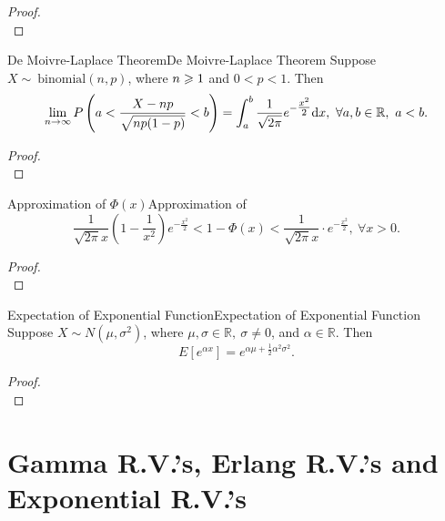\documentclass{elegantbook}
\begin{document}
\begin{proof}
\\[4cm]\vspace{0.01cm}
\end{proof}

\begin{theorem}{De Moivre-Laplace Theorem}{De Moivre-Laplace Theorem}
Suppose $X\sim\ \mathrm{binomial}(n,p)$, where $n\geqslant1$ and $0<p<1$. Then
\[\lim_{n \rightarrow \infty}{P\left( a < \frac{X - np}{\sqrt{np( 1 - p )}} < b \right) = \int_{a}^{b}\frac{1}{\sqrt{2\pi}}}e^{- \tfrac{x^{2}}{2}}\dif x,\ \forall a,b \in \mathbb{R},\ a < b.\]
\end{theorem}

\begin{proof}
\\[4cm]\vspace{0.01cm}
\end{proof}

\begin{theorem}{Approximation of $\Phi(x)$}{Approximation of }
\[\frac{1}{\sqrt{2\pi}x}\left( 1 - \frac{1}{x^{2}} \right)e^{- \tfrac{{x}^{2}}{2}} < 1 - \Phi(x) < \frac{1}{\sqrt{2\pi}x} \cdot e^{- \tfrac{{x}^{2}}{2}},\ \forall x > 0.\]
\end{theorem}

\begin{proof}
\\[4cm]\vspace{0.01cm}
\end{proof}

\begin{theorem}{Expectation of Exponential Function}{Expectation of Exponential Function}
Suppose $X\sim N(\mu,\sigma^2)$, where $\mu,\sigma\in\mathbb{R},\ \sigma\neq0$, and $\alpha\in\mathbb{R}$.
Then 
$$
E\left[e^{\alpha x}\right]=e^{\alpha\mu+\tfrac{1}{2}\alpha^2\sigma^2}.
$$
\end{theorem}

\begin{proof}
\\[4cm]\vspace{0.01cm}
\end{proof}

\section{Gamma R.V.'s, Erlang R.V.'s and Exponential R.V.'s}
\end{document}
